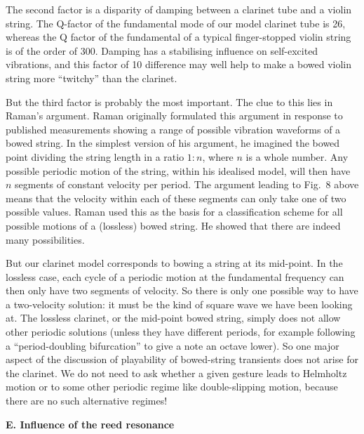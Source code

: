   The second factor is a disparity of damping between a clarinet tube and a 
  violin string. The Q-factor of the fundamental mode of our model clarinet 
  tube is 26, whereas the Q factor of the fundamental of a typical 
  finger-stopped violin string is of the order of 300. Damping has a 
  stabilising influence on self-excited vibrations, and this factor of 10 
  difference may well help to make a bowed violin string more “twitchy” than 
  the clarinet. 

  But the third factor is probably the most important. The clue to this lies in 
  Raman’s argument. Raman originally formulated this argument in response to 
  published measurements showing a range of possible vibration waveforms of a 
  bowed string. In the simplest version of his argument, he imagined the bowed 
  point dividing the string length in a ratio $1:n$, where $n$ is a whole 
  number. Any possible periodic motion of the string, within his idealised 
  model, will then have $n$ segments of constant velocity per period. The 
  argument leading to Fig.\ 8 above means that the velocity within each of 
  these segments can only take one of two possible values. Raman used this as 
  the basis for a classification scheme for all possible motions of a 
  (lossless) bowed string. He showed that there are indeed many possibilities. 

  But our clarinet model corresponds to bowing a string at its mid-point. In 
  the lossless case, each cycle of a periodic motion at the fundamental 
  frequency can then only have two segments of velocity. So there is only one 
  possible way to have a two-velocity solution: it must be the kind of square 
  wave we have been looking at. The lossless clarinet, or the mid-point bowed 
  string, simply does not allow other periodic solutions (unless they have 
  different periods, for example following a “period-doubling bifurcation” to 
  give a note an octave lower). So one major aspect of the discussion of 
  playability of bowed-string transients does not arise for the clarinet. We do 
  not need to ask whether a given gesture leads to Helmholtz motion or to some 
  other periodic regime like double-slipping motion, because there are no such 
  alternative regimes! 

  \textbf{E. Influence of the reed resonance} 

